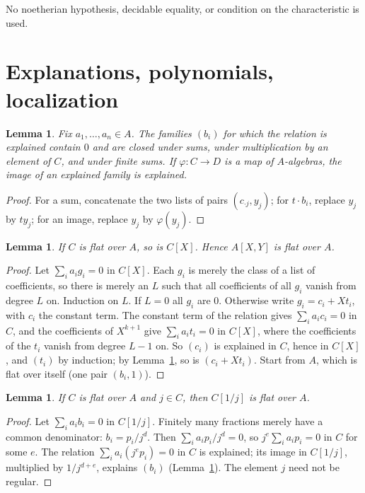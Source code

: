 \documentclass[11pt]{amsart}
\newtheorem{lemma}[theorem]{Lemma}
\theoremstyle{definition}
\theoremstyle{remark}
\begin{document}
No noetherian hypothesis, decidable equality, or condition on the
characteristic is used.

\section{Explanations, polynomials, localization}

\begin{lemma}\label{lem:ops}
Fix $a_1,\dots,a_n\in A$. The families $(b_i)$ for which the relation is
explained contain $0$ and are closed under sums, under multiplication by
an element of $C$, and under finite sums. If $\varphi:C\to D$ is a map of
$A$-algebras, the image of an explained family is explained.
\end{lemma}

\begin{proof}
For a sum, concatenate the two lists of pairs $(c_{\cdot j},y_j)$; for
$t\cdot b_i$, replace $y_j$ by $ty_j$; for an image, replace $y_j$ by
$\varphi(y_j)$.
\end{proof}

\begin{lemma}\label{lem:poly}
If $C$ is flat over $A$, so is $C[X]$. Hence $A[X,Y]$ is flat over $A$.
\end{lemma}

\begin{proof}
Let $\sum_i a_ig_i=0$ in $C[X]$. Each $g_i$ is merely the class of a list
of coefficients, so there is merely an $L$ such that all coefficients of
all $g_i$ vanish from degree $L$ on. Induction on $L$. If $L=0$ all $g_i$
are $0$. Otherwise write $g_i=c_i+Xt_i$, with $c_i$ the constant term.
The constant term of the relation gives $\sum_ia_ic_i=0$ in $C$, and the
coefficients of $X^{k+1}$ give $\sum_ia_it_i=0$ in $C[X]$, where the
coefficients of the $t_i$ vanish from degree $L-1$ on. So $(c_i)$ is
explained in $C$, hence in $C[X]$, and $(t_i)$ by induction; by
Lemma~\ref{lem:ops}, so is $(c_i+Xt_i)$. Start from $A$, which is flat
over itself (one pair $(b_i,1)$).
\end{proof}

\begin{lemma}\label{lem:loc}
If $C$ is flat over $A$ and $j\in C$, then $C[1/j]$ is flat over $A$.
\end{lemma}

\begin{proof}
Let $\sum_ia_ib_i=0$ in $C[1/j]$. Finitely many fractions merely have a
common denominator: $b_i=p_i/j^d$. Then $\sum_ia_ip_i/j^d=0$, so
$j^e\sum_ia_ip_i=0$ in $C$ for some $e$. The relation
$\sum_ia_i(j^ep_i)=0$ in $C$ is explained; its image in $C[1/j]$,
multiplied by $1/j^{d+e}$, explains $(b_i)$ (Lemma~\ref{lem:ops}). The
element $j$ need not be regular.
\end{proof}
\end{document}
